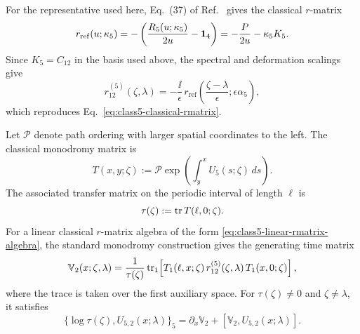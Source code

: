 For the representative used here, Eq.~(37) of
Ref.~\cite{deLeeuwFontanellaNietoGarcia2026} gives the classical
$r$-matrix
\begin{equation}
r_{\mathrm{ref}}(u;\kappa_5)
=
-\left(
\frac{R_5(u;\kappa_5)}{2u}-\mathbf{1}_4
\right)
=
-\frac{P}{2u}-\kappa_5 K_5.
\label{eq:class5-reference-rmatrix}
\end{equation}
Since $K_5=C_{12}$ in the basis used above, the spectral and deformation
scalings give
\begin{equation}
r^{(5)}_{12}(\zeta,\lambda)
=
-\frac{\ii}{\epsilon}\,
r_{\mathrm{ref}}\!\left(
\frac{\zeta-\lambda}{\epsilon};
\epsilon\alpha_5
\right),
\label{eq:class5-rmatrix-dictionary}
\end{equation}
which reproduces Eq.~\eqref{eq:class5-classical-rmatrix}.

Let $\mathcal P$ denote path ordering with larger spatial coordinates to the
left.  The classical monodromy matrix is
\begin{equation}
T(x,y;\zeta)
:=
\mathcal P\exp\!\left(
\int_y^x U_5(s;\zeta)\,ds
\right).
\label{eq:class5-classical-monodromy}
\end{equation}
The associated transfer matrix on the periodic interval of length $\ell$ is
\begin{equation}
\tau(\zeta):=\operatorname{tr} T(\ell,0;\zeta).
\label{eq:class5-classical-transfer}
\end{equation}
For a linear classical $r$-matrix algebra of the form
\eqref{eq:class5-linear-rmatrix-algebra}, the standard monodromy construction
\cite{SemenovTianShansky1983,DoikouKaraiskos2011}
gives the generating time matrix
\begin{equation}
\mathbb V_2(x;\zeta,\lambda)
=
\frac{1}{\tau(\zeta)}
\operatorname{tr}_1\!\left[
T_1(\ell,x;\zeta)
\,r^{(5)}_{12}(\zeta,\lambda)\,
T_1(x,0;\zeta)
\right],
\label{eq:class5-rmatrix-generating-V}
\end{equation}
where the trace is taken over the first auxiliary space.  For
$\tau(\zeta)\ne0$ and $\zeta\ne\lambda$, it satisfies
\begin{equation}
\{\log\tau(\zeta),U_{5,2}(x;\lambda)\}_5
=\partial_x\mathbb V_2
 +[\mathbb V_2,U_{5,2}(x;\lambda)].
\label{eq:class5-generating-hamiltonian-flow}
\end{equation}

